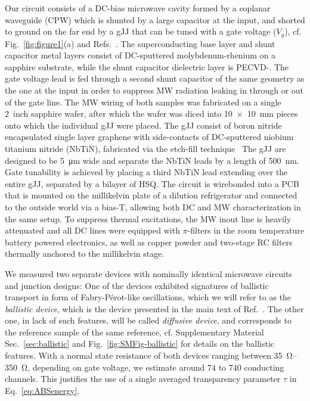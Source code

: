 Our circuit consists of a DC-bias microwave cavity formed by a coplanar waveguide (CPW) which is shunted by a large capacitor at the input, and shorted to ground on the far end by a gJJ that can be tuned with a gate voltage ($V_g$), cf. Fig.~\ref{fig:figure1}(a) and Refs.~\cite{schmidtBallisticGrapheneSuperconducting2018,schmidtCurrentDetectionUsing2020,bosmanBroadbandArchitectureGalvanically2015c}.
%
The superconducting base layer and shunt capacitor metal layers consist of DC-sputtered molybdenum-rhenium on a sapphire substrate, while the shunt capacitor dielectric layer is PECVD-.
%
The gate voltage lead is fed through a second shunt capacitor of the same geometry as the one at the input in order to suppress MW radiation leaking in through or out of the gate line.
%
The MW wiring of both samples was fabricated on a single \SI{2}{inch} sapphire wafer, after which the wafer was diced into \SI{10x10}{\milli\meter} pieces onto which the individual gJJ were placed.
%
The gJJ consist of boron nitride encapsulated single layer graphene with side-contacts of DC-sputtered niobium titanium nitride (NbTiN), fabricated via the etch-fill technique~\cite{wangOneDimensionalElectricalContact2013b,schmidtBallisticGrapheneSuperconducting2018}
%
The gJJ are designed to be \SI{5}{\micro\meter} wide and separate the NbTiN leads by a length of \SI{500}{\nano\meter}.
%
Gate tunability is achieved by placing a third NbTiN lead extending over the entire gJJ, separated by a bilayer of HSQ.
%
The circuit is wirebonded into a PCB that is mounted on the millikelvin plate of a dilution refrigerator and connected to the outside world via a bias-T, allowing both DC and MW characterization in the same setup.
%
To suppress thermal excitations, the MW inout line is heavily attenuated and all DC lines were equipped with $\pi$-filters in the room temperature battery powered electronics, as well as copper powder and two-stage RC filters thermally anchored to the millikelvin stage.

We measured two separate devices with nominally identical microwave circuits and junction designs:
%
One of the devices exhibited signatures of ballistic transport in form of Fabry-Pérot-like oscillations, which we will refer to as the \textit{ballistic device}, which is the device presented in the main text of Ref.~\cite{schmidtBallisticGrapheneSuperconducting2018}.
%
The other one, in lack of such features, will be called \textit{diffusive device}, and corresponds to the reference sample of the same reference, cf. Supplementary Material Sec.~\ref{sec:ballistic} and Fig.~\ref{fig:SMFig-ballistic} for details on the ballistic features.
%
With a normal state resistance of both devices ranging between \SIrange{35}{350}{\ohm}, depending on gate voltage, we estimate around 74 to 740 conducting channels.
%
This justifies the use of a single averaged transparency parameter $\tau$ in Eq.~\ref{eq:ABSenergy}.

